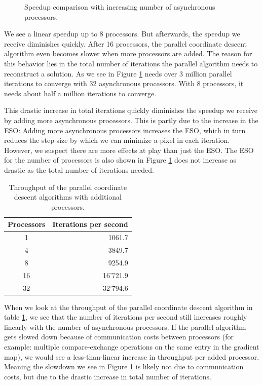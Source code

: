 \begin{figure}
\begin{subfigure}{0.30\linewidth}
	\end{subfigure}
	\caption{Speedup comparison with increasing number of asynchronous processors.}
	\label{pcdm:scalability:proc}
\end{figure}

We see a linear speedup up to 8 processors. But afterwards, the speedup we receive diminishes quickly. After 16 processors, the parallel coordinate descent algorithm even becomes slower when more processors are added. The reason for this behavior lies in the total number of iterations the parallel algorithm needs to reconstruct a solution. As we see in Figure \ref{pcdm:scalability:proc} needs over 3 million parallel iterations to converge with 32 asynchronous processors. With 8 processors, it needs about half a million iterations to converge.

This drastic increase in total iterations quickly diminishes the speedup we receive by adding more asynchronous processors. This is partly due to the increase in the ESO: Adding more asynchronous processors increases the ESO, which in turn reduces the step size by which we can minimize a pixel in each iteration. However, we suspect there are more effects at play than just the ESO. The ESO for the number of processors is also shown in Figure \ref{pcdm:scalability:proc} does not increase as drastic as the total number of iterations needed. 

\begin{table} [h]
	\centering
	\begin{tabular}{c | r }
		Processors & Iterations per second \\ \hline
		1 & 1061.7 \\
		4 & 3849.7 \\
		8 & 9254.9 \\
		16 & 16'721.9 \\
		32 & 32'794.6 \\
	\end{tabular}
	\caption{Throughput of the parallel coordinate descent algorithms with additional processors.}
	\label{pcdm:scalability:throughput}
\end{table}

When we look at the throughput of the parallel coordinate descent algorithm in table \ref{pcdm:scalability:throughput}, we see that the number of iterations per second still increases roughly linearly with the number of asynchronous processors. If the parallel algorithm gets slowed down because of communication costs between processors (for example: multiple compare-exchange operations on the same entry in the gradient map), we would see a less-than-linear increase in throughput per added processor. Meaning the slowdown we see in Figure \ref{pcdm:scalability:proc} is likely not due to communication costs, but due to the drastic increase in total number of iterations.

